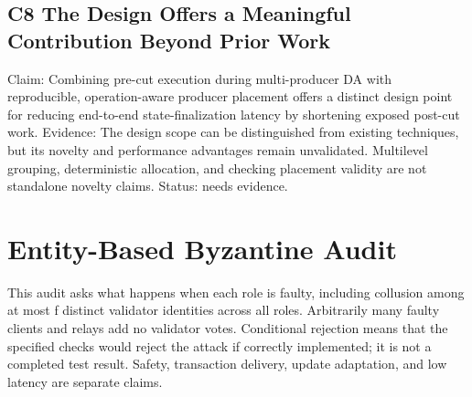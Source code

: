 \documentclass[11pt]{article}
\begin{document}
\subsection*{C8 The Design Offers a Meaningful Contribution Beyond Prior Work}

Claim: Combining pre-cut execution during multi-producer DA with reproducible, operation-aware producer placement offers a distinct design point for reducing end-to-end state-finalization latency by shortening exposed post-cut work. Evidence: The design scope can be distinguished from existing techniques, but its novelty and performance advantages remain unvalidated. Multilevel grouping, deterministic allocation, and checking placement validity are not standalone novelty claims. Status: needs evidence.


\section{Entity-Based Byzantine Audit}

This audit asks what happens when each role is faulty, including collusion among at most f distinct validator identities across all roles. Arbitrarily many faulty clients and relays add no validator votes. Conditional rejection means that the specified checks would reject the attack if correctly implemented; it is not a completed test result. Safety, transaction delivery, update adaptation, and low latency are separate claims.
\end{document}
